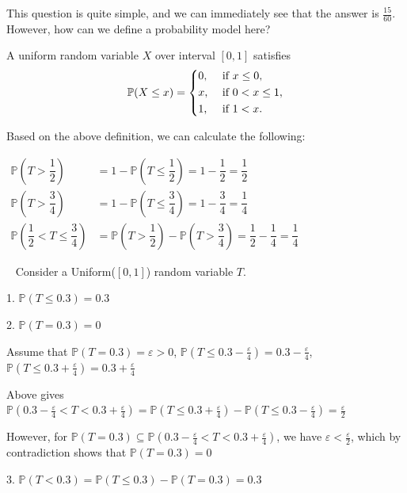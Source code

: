 This question is quite simple, and we can immediately see that the answer is \(\frac{15}{60}\). However, how can we define a probability model here?

\begin{definition}
    A uniform random variable \(X\) over interval \([0, 1]\) satisfies 
    \[
        \mathbb{P}(X \leq x) = \begin{dcases}
            0, &\text{ if } x \leq 0 ,\\
            x, &\text{ if } 0 < x \leq 1 ,\\
            1, &\text{ if } 1 < x.
        \end{dcases}
    \]
\end{definition}

Based on the above definition, we can calculate the following: 

\(
\begin{aligned}
    \mathbb{P}(T > \dfrac{1}{2}) &= 1 - \mathbb{P}(T \leq \dfrac{1}{2}) = 1 - \dfrac{1}{2} = \dfrac{1}{2} \\
    \mathbb{P}(T > \dfrac{3}{4}) &= 1 - \mathbb{P}(T \leq \dfrac{3}{4}) = 1 - \dfrac{3}{4} = \dfrac{1}{4} \\
    \mathbb{P}(\dfrac{1}{2} < T \leq \dfrac{3}{4}) &= \mathbb{P}(T > \dfrac{1}{2}) - \mathbb{P}(T > \dfrac{3}{4}) = \dfrac{1}{2} - \dfrac{1}{4} = \dfrac{1}{4}
\end{aligned}
\) 

\begin{eg}~ 
    Consider a Uniform(\([0, 1]\)) random variable \(T\). 

    1. \(\mathbb{P}(T \leq 0.3) = 0.3\) 

    2. \(\mathbb{P}(T = 0.3) = 0\)
        
    Assume that \(\mathbb{P}(T = 0.3) = \varepsilon > 0\), \(\mathbb{P}(T \leq 0.3 - \frac{\varepsilon}{4}) = 0.3 - \frac{\varepsilon}{4}\), \(\mathbb{P}(T \leq 0.3 + \frac{\varepsilon}{4}) = 0.3 + \frac{\varepsilon}{4}\)

    Above gives \(\mathbb{P}(0.3 - \frac{\varepsilon}{4} < T < 0.3 + \frac{\varepsilon}{4}) = \mathbb{P}(T \leq 0.3 + \frac{\varepsilon}{4}) - \mathbb{P}(T \leq 0.3 - \frac{\varepsilon}{4}) = \frac{\varepsilon}{2}\) 

    However, for \(\mathbb{P}(T = 0.3) \subseteq \mathbb{P}(0.3 - \frac{\varepsilon}{4} < T < 0.3 + \frac{\varepsilon}{4})\), we have \(\varepsilon < \frac{\varepsilon}{2}\), which by contradiction shows that \(\mathbb{P}(T = 0.3) = 0\)

    3. \(\mathbb{P}(T < 0.3) = \mathbb{P}(T \leq 0.3) - \mathbb{P}(T = 0.3) = 0.3\)
\end{eg}

